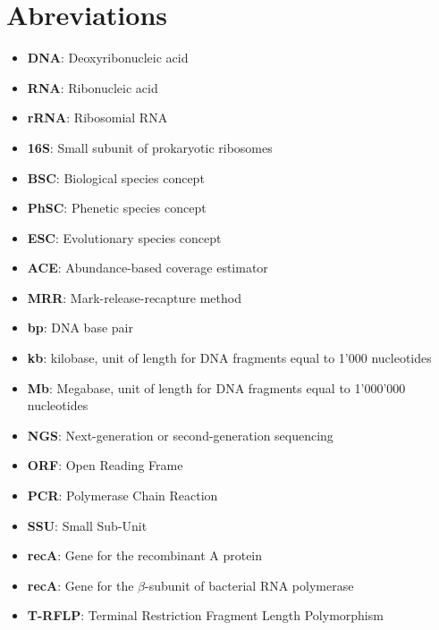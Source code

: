 \logvartrue
\chapter{Abreviations}

\begin{itemize}
\item \textbf{DNA}: Deoxyribonucleic acid
\item \textbf{RNA}: Ribonucleic acid
\item \textbf{rRNA}: Ribosomial RNA
\item \textbf{16S}: Small subunit of prokaryotic ribosomes
\item \textbf{BSC}: Biological species concept
\item \textbf{PhSC}: Phenetic species concept
\item \textbf{ESC}: Evolutionary species concept
\item \textbf{ACE}: Abundance-based coverage estimator
\item \textbf{MRR}: Mark-release-recapture method
\item \textbf{bp}: DNA base pair
\item \textbf{kb}: kilobase, unit of length for DNA fragments equal to 1'000 nucleotides
\item \textbf{Mb}: Megabase, unit of length for DNA fragments equal to 1'000'000 nucleotides
\item \textbf{NGS}: Next-generation or second-generation sequencing
\item \textbf{ORF}: Open Reading Frame
\item \textbf{PCR}: Polymerase Chain Reaction
\item \textbf{SSU}: Small Sub-Unit
\item \textbf{recA}: Gene for the recombinant A protein
\item \textbf{recA}: Gene for the $\beta$-subunit of bacterial RNA polymerase
\item \textbf{T-RFLP}: Terminal Restriction Fragment Length Polymorphism
 

\end{itemize}
